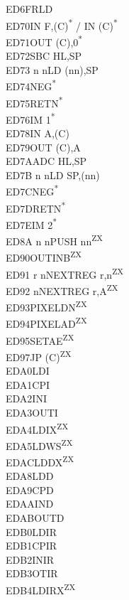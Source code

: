 \documentclass[twoside,openright,a4paper]{book}
\begin{document}
\begin{multicols}{3}
{\begin{tabbing}
	ED6F\>RLD\\
	ED70\>IN F,(C)\textsuperscript{*} / IN (C)\textsuperscript{*}\\
	ED71\>OUT (C),0\textsuperscript{*}\\
	ED72\>SBC HL,SP\\
	ED73 n n\>LD (nn),SP\\
	ED74\>NEG\textsuperscript{*}\\
	ED75\>RETN\textsuperscript{*}\\
	ED76\>IM 1\textsuperscript{*}\\
	ED78\>IN A,(C)\\
	ED79\>OUT (C),A\\
	ED7A\>ADC HL,SP\\
	ED7B n n\>LD SP,(nn)\\
	ED7C\>NEG\textsuperscript{*}\\
	ED7D\>RETN\textsuperscript{*}\\
	ED7E\>IM 2\textsuperscript{*}\\
	ED8A n n\>PUSH nn\textsuperscript{ZX}\\
	ED90\>OUTINB\textsuperscript{ZX}\\
	ED91 r n\>NEXTREG r,n\textsuperscript{ZX}\\
	ED92 n\>NEXTREG r,A\textsuperscript{ZX}\\
	ED93\>PIXELDN\textsuperscript{ZX}\\
	ED94\>PIXELAD\textsuperscript{ZX}\\
	ED95\>SETAE\textsuperscript{ZX}\\
	ED97\>JP (C)\textsuperscript{ZX}\\
	EDA0\>LDI\\
	EDA1\>CPI\\
	EDA2\>INI\\
	EDA3\>OUTI\\
	EDA4\>LDIX\textsuperscript{ZX}\\
	EDA5\>LDWS\textsuperscript{ZX}\\
	EDAC\>LDDX\textsuperscript{ZX}\\
	EDA8\>LDD\\
	EDA9\>CPD\\
	EDAA\>IND\\
	EDAB\>OUTD\\
	EDB0\>LDIR\\
	EDB1\>CPIR\\
	EDB2\>INIR\\
	EDB3\>OTIR\\
	EDB4\>LDIRX\textsuperscript{ZX}\\

\end{tabbing}}
\end{multicols}
\end{document}
